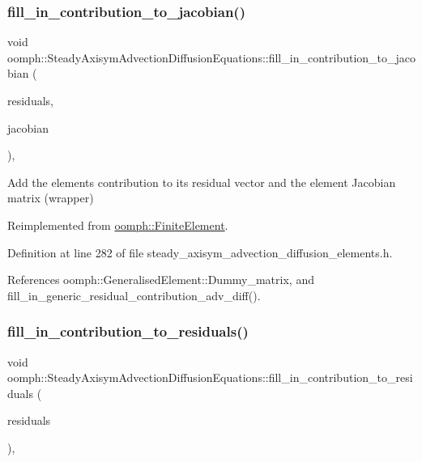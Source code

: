 \subsubsection{\texorpdfstring{fill\+\_\+in\+\_\+contribution\+\_\+to\+\_\+jacobian()}{fill\_in\_contribution\_to\_jacobian()}}
{\footnotesize\ttfamily void oomph\+::\+Steady\+Axisym\+Advection\+Diffusion\+Equations\+::fill\+\_\+in\+\_\+contribution\+\_\+to\+\_\+jacobian (\begin{DoxyParamCaption}\item[{\hyperlink{classoomph_1_1Vector}{Vector}$<$ double $>$ \&}]{residuals,  }\item[{\hyperlink{classoomph_1_1DenseMatrix}{Dense\+Matrix}$<$ double $>$ \&}]{jacobian }\end{DoxyParamCaption})\hspace{0.3cm}{\ttfamily [inline]}, {\ttfamily [virtual]}}



Add the element\textquotesingle{}s contribution to its residual vector and the element Jacobian matrix (wrapper) 



Reimplemented from \hyperlink{classoomph_1_1FiniteElement_a0ae7af222af38a0d53bf283dc85bdfea}{oomph\+::\+Finite\+Element}.



Definition at line 282 of file steady\+\_\+axisym\+\_\+advection\+\_\+diffusion\+\_\+elements.\+h.



References oomph\+::\+Generalised\+Element\+::\+Dummy\+\_\+matrix, and fill\+\_\+in\+\_\+generic\+\_\+residual\+\_\+contribution\+\_\+adv\+\_\+diff().

\mbox{\label{classoomph_1_1SteadyAxisymAdvectionDiffusionEquations_a7e42c76888ac644f855b17d9d7b3740b}} 
\subsubsection{\texorpdfstring{fill\+\_\+in\+\_\+contribution\+\_\+to\+\_\+residuals()}{fill\_in\_contribution\_to\_residuals()}}
{\footnotesize\ttfamily void oomph\+::\+Steady\+Axisym\+Advection\+Diffusion\+Equations\+::fill\+\_\+in\+\_\+contribution\+\_\+to\+\_\+residuals (\begin{DoxyParamCaption}\item[{\hyperlink{classoomph_1_1Vector}{Vector}$<$ double $>$ \&}]{residuals }\end{DoxyParamCaption})\hspace{0.3cm}{\ttfamily [inline]}, {\ttfamily [virtual]}}




